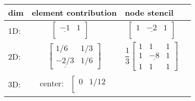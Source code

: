 \begin{table}[h]
\centering
\begin{tabular}{l|l|l|l}
    dim & element contribution & node stencil\\
    \hline
    1D: &
\begin{minipage}{6cm}
  \begin{equation*}
     \left[\begin{array}{ccc}
        \underline{-1} & 1\\
    \end{array}\right] \quad 
  \end{equation*}
\end{minipage} 
    &
\begin{minipage}{6cm}
  \begin{equation*}
    \left[\begin{array}{ccc}
        1 & \underline{-2} & 1\\
    \end{array}\right]
  \end{equation*}
\end{minipage} 
     \\[4mm]
     \hline
    2D:&
\begin{minipage}{6cm}
  \begin{equation*}
    \left[
      \begin{array}{ccc}
        1/6 & 1/3 \\
        \underline{-2/3} & 1/6
      \end{array}
    \right]
  \end{equation*}
\end{minipage}  &
\begin{minipage}{6cm}
  \begin{equation*}
      \dfrac13\left[
        \begin{array}{ccc}
          1 & 1 & 1\\
          1 & \underline{-8} & 1 \\
          1 & 1 & 1
        \end{array}
      \right]
  \end{equation*}
\end{minipage}  \\[4mm]
    \hline
    3D: &
\begin{minipage}{6cm}
  \begin{equation*}
    \begin{array}{ll}
      \text{center:} &
      \left[\begin{array}{ccc}
          0 & 1/12\\

\end{array}
\end{array}
\end{equation*}
\end{minipage}
\end{tabular}
\end{table}
